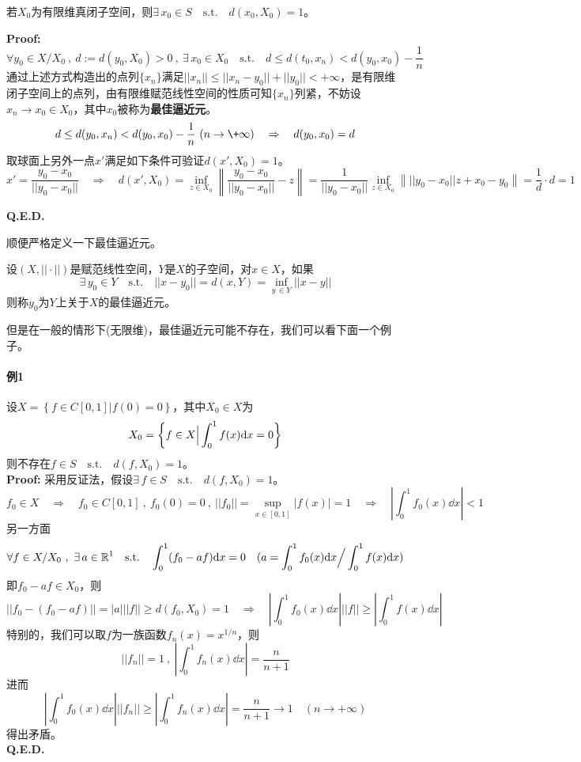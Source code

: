 \begin{proposition}
    若$X_0$为有限维真闭子空间，则$\exists \, x_0 \in S \quad \text{s.t.} \quad d(x_0,X_0)=1$。
\end{proposition}
\textbf{Proof:} 
\[\forall y_0 \in X/X_0 \ , \ d:=d(y_0,X_0)>0 \ , \ \exists \, x_0 \in X_0 \quad \text{s.t.} \quad d \leq d(t_0,x_n)<d(y_0,x_0)-\frac{1}{n}\]
通过上述方式构造出的点列$\{x_n\}$满足$||x_n|| \leq ||x_n-y_0||+||y_0||<+\infty$，是有限维闭子空间上的点列，由有限维赋范线性空间的性质可知$\{x_n\}$列紧，不妨设$x_n \to x_0 \in X_0$，其中$x_0$被称为\textbf{最佳逼近元}。
\[d \leq d(y_0,x_n)<d(y_0,x_0)-\frac{1}{n} \ (n \to \+\infty) \quad \Rightarrow \quad d(y_0,x_0)=d\]
取球面上另外一点$x'$满足如下条件可验证$d(x',X_0)=1$。
\[x'=\frac{y_0-x_0}{||y_0-x_0||} \quad \Rightarrow \quad d(x',X_0)=\mathop \text{inf}\limits_{z \in X_0}\left\|\frac{y_0-x_0}{||y_0-x_0||}-z\right\|=\frac{1}{||y_0-x_0||}\mathop \text{inf}\limits_{z \in X_0}\left\|||y_0-x_0||z+x_0-y_0\right\|=\frac{1}{d} \cdot d=1\]

\textbf{Q.E.D.}

顺便严格定义一下最佳逼近元。
\begin{definition}[最佳逼近元]
    设$(X,||\cdot||)$是赋范线性空间，$Y$是$X$的子空间，对$x \in X$，如果
    \[\exists \, y_0 \in Y \quad \text{s.t.} \quad ||x-y_0||=d(x,Y)=\mathop \text{inf}\limits_{y \, \in Y}||x-y||\]
    则称$y_0$为$Y$上关于$X$的最佳逼近元。
\end{definition}

但是在一般的情形下(无限维)，最佳逼近元可能不存在，我们可以看下面一个例子。

\paragraph*{例1} \quad 设$X=\left\{f \in C[0,1]|f(0)=0\right\}$，其中$X_0 \in X$为
\[X_0=\left\{f \in X \Big{|} \int_0^1f(x)\dd x=0\right\}\]
则不存在$f \in S \quad \text{s.t.} \quad d(f,X_0)=1$。\\
\textbf{Proof:} \quad 采用反证法，假设$\exists \, f \in S \quad \text{s.t.} \quad d(f,X_0)=1$。
\[f_0 \in X \quad \Rightarrow \quad f_0 \in C[0,1] \ , \ f_0(0)=0 \ , \ ||f_0||=\mathop \text{sup}\limits_{x \in [0,1]}|f(x)|=1 \quad \Rightarrow \quad \left|\int_0^1f_0(x)\dd x\right|<1\]
另一方面
\[\forall f \in X/X_0 \ , \ \exists \, a \in \mathbb{R}^1 \quad \text{s.t.} \quad \int_0^1(f_0-af)\dd x=0 \quad (a=\int_0^1f_0(x)\dd x \Big{/} \int_0^1f(x)\dd x)\]
即$f_0-af \in X_0$，则
\[||f_0-(f_0-af)||=|a|||f|| \geq d(f_0,X_0)=1 \quad \Rightarrow \quad \left|\int_0^1f_0(x)\dd x\right|||f|| \geq \left|\int_0^1f(x)\dd x\right|\]
特别的，我们可以取$f$为一族函数$f_n(x)=x^{1/n}$，则
\[||f_n||=1 \ , \ \left|\int_0^1f_n(x)\dd x\right|=\frac{n}{n+1}\]
进而
\[\left|\int_0^1f_0(x)\dd x\right|||f_n|| \geq \left|\int_0^1f_n(x)\dd x\right|=\frac{n}{n+1} \to 1 \quad (n \to +\infty)\]
得出矛盾。\\
\textbf{Q.E.D.}

